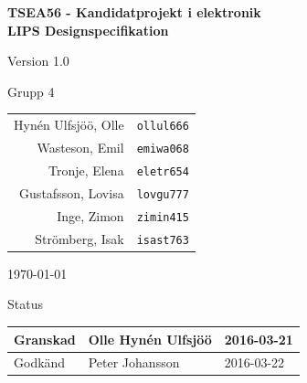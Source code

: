 \documentclass[11pt]{article}
\begin{document}
\begin{titlepage}
\begin{center}

{\Large\bfseries TSEA56 - Kandidatprojekt i elektronik \\ LIPS Designspecifikation}

\vspace{5em}

Version 1.0

\vspace{5em}
Grupp 4 \\
\begin{tabular}{rl}
Hynén Ulfsjöö, Olle&\verb+ollul666+
\\
Wasteson, Emil&\verb+emiwa068+
\\
Tronje, Elena&\verb+eletr654+
\\
Gustafsson, Lovisa&\verb+lovgu777+
\\
Inge, Zimon&\verb+zimin415+
\\
Strömberg, Isak&\verb+isast763+
\\
\end{tabular}

\vspace{5em}
\today

\vspace{16em}
Status
\begin{longtable}{|l|l|l|} \hline

Granskad & Olle Hynén Ulfsjöö & 2016-03-21 \\ \hline
Godkänd & Peter Johansson & 2016-03-22 \\ \hline
 
\end{longtable}

\end{center}
\end{titlepage}
\end{document}
